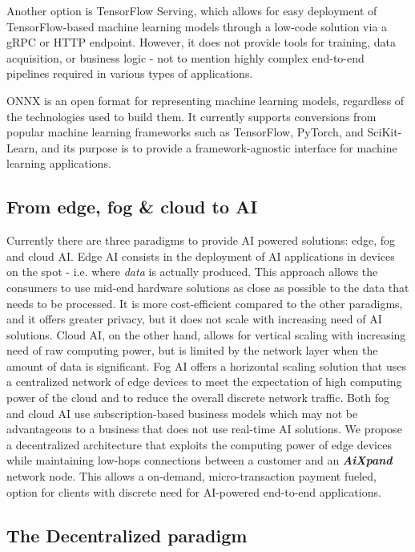 \documentclass{article}
\begin{document}
Another option is TensorFlow Serving, which allows for easy deployment of TensorFlow-based machine learning models through a low-code solution via a gRPC or HTTP endpoint. However, it does not provide tools for training, data acquisition, or business logic - not to mention highly complex end-to-end pipelines required in various types of applications.

ONNX is an open format for representing machine learning models, regardless of the technologies used to build them. It currently supports conversions from popular machine learning frameworks such as TensorFlow, PyTorch, and SciKit-Learn, and its purpose is to provide a framework-agnostic interface for machine learning applications.

\subsection{From edge, fog \& cloud to AI}
Currently there are three paradigms to provide AI powered solutions: edge, fog and cloud AI. Edge AI \cite{wang2020edge} consists in the deployment of AI applications in devices on the spot - i.e. where \textit{data} is actually produced. This approach allows the consumers to use mid-end hardware solutions as close as possible to the data that needs to be processed. It is more cost-efficient compared to the other paradigms, and it offers greater privacy, but it does not scale with increasing need of AI solutions. Cloud AI, on the other hand, allows for vertical scaling with increasing need of raw computing power, but is limited by the network layer when the amount of data is significant. Fog AI offers a horizontal scaling solution that uses a centralized network of edge devices to meet the expectation of high computing power of the cloud and to reduce the overall discrete network traffic. Both fog and cloud AI use subscription-based business models which may not be advantageous to a business that does not use real-time AI solutions. We propose a decentralized architecture that exploits the computing power of edge devices while maintaining low-hops connections between a customer and an \textbf{\textit{AiXpand}} network node. This allows a on-demand, micro-transaction payment fueled, option for clients with discrete need for AI-powered end-to-end applications. 

\subsection{The Decentralized paradigm }
\end{document}
